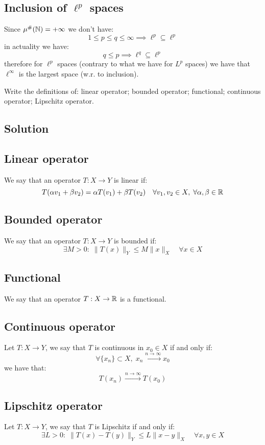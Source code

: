 \subsection{Inclusion of \texorpdfstring{$\ell^p$}{lp} spaces}
Since $\mu^\#(\mathbb{N})=+\infty$ we don't have:
\[ 1 \leq p \leq q \leq \infty  \implies \ell^p \subseteq \ell^p \]
in actuality we have:
\[ q \leq p \implies \ell^q \subseteq \ell^p \]
therefore for $\ell^p$ spaces (contrary to what we have for $L^p$ spaces) we have that $\ell^\infty$ is the largest space (w.r. to inclusion).


\question
Write the definitions of: linear operator; bounded operator; functional; continuous operator; Lipschitz operator.

\subsection*{Solution}

\subsection{Linear operator}
We say that an operator $T:X\to Y$ is linear if:
\[ T(\alpha v_1 + \beta v_2) = \alpha T(v_1) + \beta T(v_2) \quad \forall v_1, v_2 \in X, \; \forall \alpha, \beta \in \mathbb{R} \]

\subsection{Bounded operator}
We say that an operator $T:X\to Y$ is bounded if:
\[ \exists M > 0: \; \|T(x)\|_Y \leq M \|x\|_X \quad \forall x \in X \]

\subsection{Functional}
We say that an operator $T:X\to \mathbb{R}$ is a functional.

\subsection{Continuous operator}
Let $T:X\to Y$, we say that $T$ is continuous in $x_0 \in X$ if and only if:
\[ \forall \{x_n\} \subset X,\; x_n \xrightarrow{n\to\infty} x_0 \]
we have that:
\[ T(x_n) \xrightarrow{n\to\infty} T(x_0) \]

\subsection{Lipschitz operator}
Let $T:X\to Y$, we say that $T$ is Lipschitz if and only if:
\[ \exists L>0 : \; \|T(x) - T(y)\|_Y \leq L\|x-y\|_X \quad \forall x,y \in X \]


